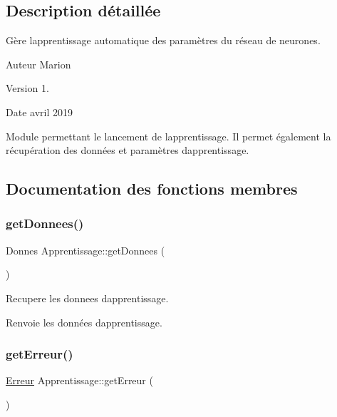\subsection{Description détaillée}
Gère l\textquotesingle{}apprentissage automatique des paramètres du réseau de neurones. 

\begin{DoxyAuthor}{Auteur}
Marion 
\end{DoxyAuthor}
\begin{DoxyVersion}{Version}
1. 
\end{DoxyVersion}
\begin{DoxyDate}{Date}
avril 2019
\end{DoxyDate}
Module permettant le lancement de l\textquotesingle{}apprentissage. Il permet également la récupération des données et paramètres d\textquotesingle{}apprentissage. 

\subsection{Documentation des fonctions membres}
\mbox{\label{classApprentissage_ac9fbf481a1bc46c15a36129c1eba3796}} 
\subsubsection{\texorpdfstring{get\+Donnees()}{getDonnees()}}
{\footnotesize\ttfamily Donnes Apprentissage\+::get\+Donnees (\begin{DoxyParamCaption}{ }\end{DoxyParamCaption})}



Recupere les donnees d\textquotesingle{}apprentissage. 

\begin{DoxyReturn}{Renvoie}
les données d\textquotesingle{}apprentissage. 
\end{DoxyReturn}
\mbox{\label{classApprentissage_a9df18f6e95729c7263a2ab1fa9a0df8f}} 
\subsubsection{\texorpdfstring{get\+Erreur()}{getErreur()}}
{\footnotesize\ttfamily \hyperlink{classErreur}{Erreur} Apprentissage\+::get\+Erreur (\begin{DoxyParamCaption}{ }\end{DoxyParamCaption})}



